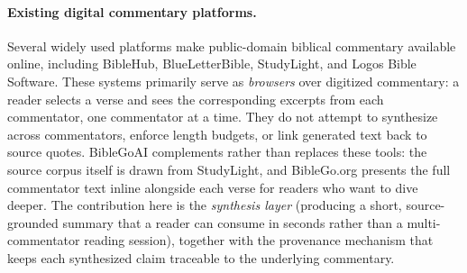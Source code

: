 \paragraph{Existing digital commentary platforms.}
Several widely used platforms make public-domain biblical commentary available online, including BibleHub, BlueLetterBible, StudyLight, and Logos Bible Software. These systems primarily serve as \emph{browsers} over digitized commentary: a reader selects a verse and sees the corresponding excerpts from each commentator, one commentator at a time. They do not attempt to synthesize across commentators, enforce length budgets, or link generated text back to source quotes. BibleGoAI complements rather than replaces these tools: the source corpus itself is drawn from StudyLight, and BibleGo.org presents the full commentator text inline alongside each verse for readers who want to dive deeper. The contribution here is the \emph{synthesis layer} (producing a short, source-grounded summary that a reader can consume in seconds rather than a multi-commentator reading session), together with the provenance mechanism that keeps each synthesized claim traceable to the underlying commentary.
